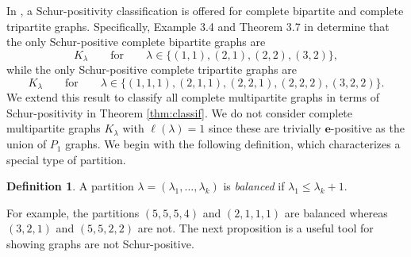 \documentclass[12pt]{amsart}
\numberwithin{equation}{section}
\theoremstyle{plain}
\theoremstyle{definition}
\newtheorem{definition}[equation]{Definition}
\theoremstyle{remark}
\begin{document}
In \cite{WW2020}, a Schur-positivity classification is offered for complete bipartite and complete tripartite graphs. Specifically, Example 3.4 and Theorem 3.7 in \cite{WW2020} determine that the only Schur-positive complete bipartite graphs are
\[
K_{\lambda}\qquad \text{for}\qquad \lambda\in \{(1,1), (2,1), (2,2), (3,2)\},
\] while the only Schur-positive complete tripartite graphs are
\[
K_{\lambda}\qquad \text{for}\qquad\lambda\in\{(1,1,1), (2,1,1), (2,2,1), (2,2,2), (3,2,2)\}.
\]
We extend this result to classify all complete multipartite graphs in terms of Schur-positivity in Theorem \ref{thm:classif}. We do not consider complete multipartite graphs $K_{\lambda}$ with $\ell(\lambda)=1$ since these are trivially $\mathbf{e}$-positive as the union of $P_1$ graphs. We begin with the following definition, which characterizes a special type of partition. 




\begin{definition}
A partition $\lambda=(\lambda_1,\dots,\lambda_k)$ is \textit{balanced} if $\lambda_1\le \lambda_k+1$. 
\end{definition}


For example, the partitions $(5,5,5,4)$ and $(2,1,1,1)$ are balanced whereas $(3,2,1)$ and $(5,5,2,2)$ are not. The next proposition is a useful tool for showing graphs are not Schur-positive. 
\end{document}
